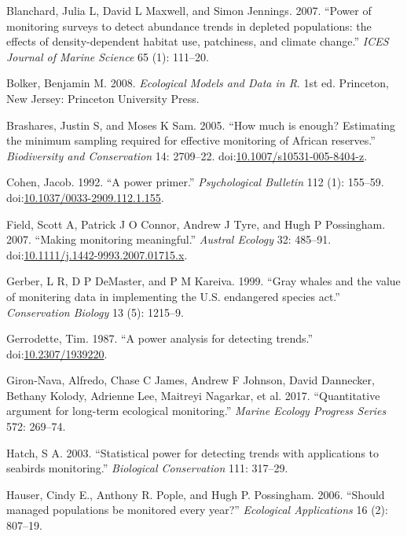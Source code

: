 \documentclass[12pt,]{article}
\begin{document}
\hypertarget{refs}{}
\hypertarget{ref-Blanchard2007}{}
Blanchard, Julia L, David L Maxwell, and Simon Jennings. 2007. ``Power
of monitoring surveys to detect abundance trends in depleted
populations: the effects of density-dependent habitat use, patchiness,
and climate change.'' \emph{ICES Journal of Marine Science} 65 (1):
111--20.

\hypertarget{ref-Bolker2008}{}
Bolker, Benjamin M. 2008. \emph{Ecological Models and Data in R}. 1st
ed. Princeton, New Jersey: Princeton University Press.

\hypertarget{ref-Brashares2005}{}
Brashares, Justin S, and Moses K Sam. 2005. ``How much is enough?
Estimating the minimum sampling required for effective monitoring of
African reserves.'' \emph{Biodiversity and Conservation} 14: 2709--22.
doi:\href{https://doi.org/10.1007/s10531-005-8404-z}{10.1007/s10531-005-8404-z}.

\hypertarget{ref-Cohen1992}{}
Cohen, Jacob. 1992. ``A power primer.'' \emph{Psychological Bulletin}
112 (1): 155--59.
doi:\href{https://doi.org/10.1037/0033-2909.112.1.155}{10.1037/0033-2909.112.1.155}.

\hypertarget{ref-Field2007}{}
Field, Scott A, Patrick J O Connor, Andrew J Tyre, and Hugh P
Possingham. 2007. ``Making monitoring meaningful.'' \emph{Austral
Ecology} 32: 485--91.
doi:\href{https://doi.org/10.1111/j.1442-9993.2007.01715.x}{10.1111/j.1442-9993.2007.01715.x}.

\hypertarget{ref-Gerber1999}{}
Gerber, L R, D P DeMaster, and P M Kareiva. 1999. ``Gray whales and the
value of monitering data in implementing the U.S. endangered species
act.'' \emph{Conservation Biology} 13 (5): 1215--9.

\hypertarget{ref-Gerrodette1987}{}
Gerrodette, Tim. 1987. ``A power analysis for detecting trends.''
doi:\href{https://doi.org/10.2307/1939220}{10.2307/1939220}.

\hypertarget{ref-Giron-Nava2017}{}
Giron-Nava, Alfredo, Chase C James, Andrew F Johnson, David Dannecker,
Bethany Kolody, Adrienne Lee, Maitreyi Nagarkar, et al. 2017.
``Quantitative argument for long-term ecological monitoring.''
\emph{Marine Ecology Progress Series} 572: 269--74.

\hypertarget{ref-Hatch2003}{}
Hatch, S A. 2003. ``Statistical power for detecting trends with
applications to seabirds monitoring.'' \emph{Biological Conservation}
111: 317--29.

\hypertarget{ref-Hauser2006}{}
Hauser, Cindy E., Anthony R. Pople, and Hugh P. Possingham. 2006.
``Should managed populations be monitored every year?'' \emph{Ecological
Applications} 16 (2): 807--19.
\end{document}
